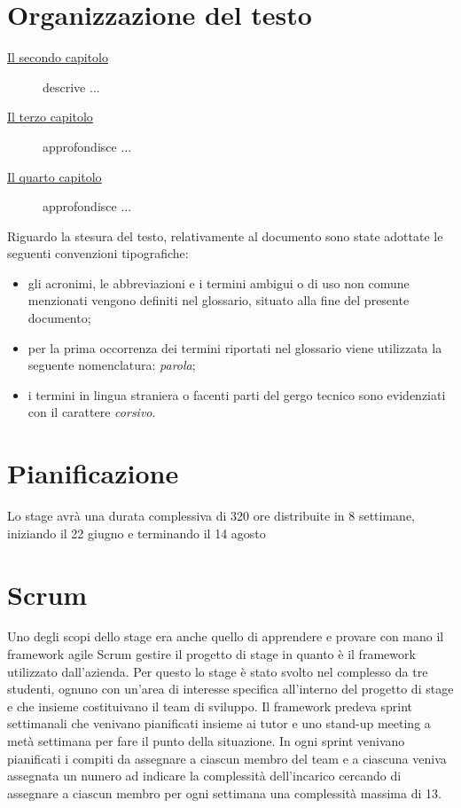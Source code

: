 \section{Organizzazione del testo}

\begin{description}
    \item[{\hyperref[cap:processi-metodologie]{Il secondo capitolo}}] descrive ...
    
    \item[{\hyperref[cap:descrizione-stage]{Il terzo capitolo}}] approfondisce ...
    
    \item[{\hyperref[cap:analisi-requisiti]{Il quarto capitolo}}] approfondisce ...

\end{description}

Riguardo la stesura del testo, relativamente al documento sono state adottate le seguenti convenzioni tipografiche:
\begin{itemize}
	\item gli acronimi, le abbreviazioni e i termini ambigui o di uso non comune menzionati vengono definiti nel glossario, situato alla fine del presente documento;
	\item per la prima occorrenza dei termini riportati nel glossario viene utilizzata la seguente nomenclatura: \emph{parola}\glsfirstoccur;
	\item i termini in lingua straniera o facenti parti del gergo tecnico sono evidenziati con il carattere \emph{corsivo}.
\end{itemize}

\section{Pianificazione}
Lo stage avrà una durata complessiva di 320 ore distribuite in 8 settimane, iniziando il 22 giugno e terminando il 14 agosto

\section{Scrum}
Uno degli scopi dello stage era anche quello di apprendere e provare con mano il framework agile Scrum gestire il progetto di stage in quanto è il framework utilizzato dall'azienda.
Per questo lo stage è stato svolto nel complesso da tre studenti, ognuno con un'area di interesse specifica all'interno del progetto di stage e che insieme costituivano il team di sviluppo.
Il framework predeva sprint settimanali che venivano pianificati insieme ai tutor e uno stand-up meeting a metà settimana per fare il punto della situazione.
In ogni sprint venivano pianificati i compiti da assegnare a ciascun membro del team e a ciascuna veniva assegnata un numero ad indicare la complessità dell'incarico cercando di assegnare a ciascun membro per ogni settimana una complessità massima di 13. 

